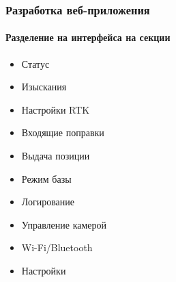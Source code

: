 \documentclass[xetex,t]{beamer}
\begin{document}

%
%
\begin{frame}
  \frametitle{Разработка веб-приложения}
  \framesubtitle{Разделение на интерфейса на секции}

  \begin{minipage}[c]{\textwidth}
    \centering
    \footnotesize
    \vskip 0.5cm
    \begin{minipage}[c]{.32\textwidth}
      \begin{itemize}
        \item<1> Статус
        \item<2> Изыскания
        \item<3> Настройки RTK
        \item<4> Входящие поправки
        \item<5> Выдача позиции
        \item<6> Режим базы
        \item<7> Логирование
        \item<8> Управление камерой
        \item<9> Wi-Fi/Bluetooth
        \item<10> Настройки
      \end{itemize}
    \end{minipage}
    \hspace{1em}
    \begin{minipage}[c]{.64\textwidth}
\end{minipage}
\end{minipage}
\end{frame}
\end{document}
